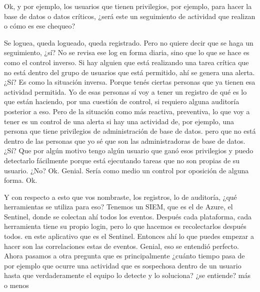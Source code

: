 \begin{description}[leftmargin=0cm, labelsep=0.5cm]
    \item[\textbf{MOCIULSKY SANTIAGO:}] Ok, y por ejemplo, los usuarios que tienen privilegios, por ejemplo, para hacer la base de datos o datos críticos, ¿será este un seguimiento de actividad que realizan o cómo es ese chequeo?

    \item[\textbf{JACUBOVICH LUCIANA:}] Se loguea, queda logueado, queda registrado. Pero no quiere decir que se haga un seguimiento, ¿sí? No se revisa ese log en forma diaria, sino que lo que se hace es como el control inverso. Si hay alguien que está realizando una tarea crítica que no está dentro del grupo de usuarios que está permitido, ahí se genera una alerta. ¿Sí? Es como la situación inversa. Porque tenés ciertas personas que ya tienen esa actividad permitida. Yo de esas personas sí voy a tener un registro de qué es lo que están haciendo, por una cuestión de control, si requiero alguna auditoría posterior a eso. Pero de la situación como más reactiva, preventiva, lo que voy a tener es un control de una alerta si hay una actividad de, por ejemplo, una persona que tiene privilegios de administración de base de datos. pero que no está dentro de las personas que yo sé que son las administradoras de base de datos. ¿Sí? Que por algún motivo tengo algún usuario que ganó esos privilegios y puedo detectarlo fácilmente porque está ejecutando tareas que no son propias de su usuario. ¿No? Ok. Genial. Sería como medio un control por oposición de alguna forma. Ok.

    \item[\textbf{MOCIULSKY SANTIAGO:}] Y con respecto a esto que vos nombraste, los registros, lo de auditoría, ¿qué herramientas se utiliza para eso? Tenemos un SIEM, que es el de Azure, el Sentinel, donde se colectan ahí todos los eventos. Después cada plataforma, cada herramienta tiene su propio login, pero lo que hacemos es recolectarlos después todos. en este aplicativo que es el Sentinel. Entonces ahí lo que puedes empezar a hacer son las correlaciones estas de eventos. Genial, eso se entendió perfecto. Ahora pasamos a otra pregunta que es principalmente ¿cuánto tiempo pasa de por ejemplo que ocurre una actividad que es sospechosa dentro de un usuario hasta que verdaderamente el equipo lo detecte y lo soluciona? ¿se entiende? más o menos


\end{description}
